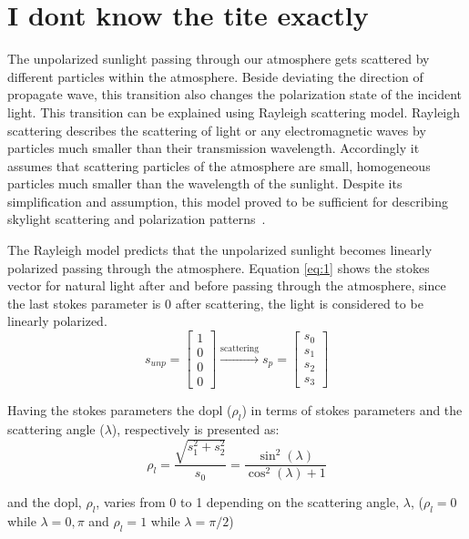 \section{I dont know the tite exactly}
\label{sec:rayleigh}

The unpolarized sunlight passing through our atmosphere gets scattered by
different particles within the atmosphere.  Beside deviating the direction of
propagate wave, this transition also changes the polarization state of the
incident light. This transition can be explained using Rayleigh scattering
model.  Rayleigh scattering describes the scattering of light or any
electromagnetic waves by particles much smaller than their transmission
wavelength. Accordingly it assumes that scattering particles of the atmosphere
are small, homogeneous particles much smaller than the wavelength of the
sunlight.  Despite its simplification and assumption, this model proved to be
sufficient for describing skylight scattering and polarization
patterns~\cite{pomozi2001clearsky, horvath2002ground}.

The Rayleigh model predicts that the unpolarized sunlight becomes linearly
polarized passing through the atmosphere.
Equation \ref{eq:1} shows the stokes vector for natural light after and before
passing through the atmosphere, since the last stokes parameter is $0$ after
scattering, the light is considered to be linearly polarized.
\begin{equation}
  \label{eq:1}
  s_{unp} =
  \begin{bmatrix}
    1\\0\\0\\0
  \end{bmatrix}
  \xrightarrow[]{\text{scattering}}
  s_{p}=
  \begin{bmatrix}
   s_0 \\ s_1 \\ s_2 \\ s_3
 \end{bmatrix}
\end{equation}

Having the stokes parameters the \gls{dopl} ($\rho_{l}$) in terms of stokes
parameters and the scattering angle ($\lambda$), respectively is presented as:
\begin{equation}
  \label{eq:2}
  \rho_{l} = \frac{\sqrt{s_{1}^{2}+s_{2}^{2}}}{s_0} =
  \frac{\sin^{2}(\lambda)}{\cos^{
      2}(\lambda)+1}
\end{equation}


and the \gls{dopl}, $\rho_{l}$, varies
from 0 to 1 depending on the scattering angle, $\lambda$, ($\rho_{l} = 0$ while
$\lambda = 0, \pi$ and $\rho_{l} =1$ while $\lambda =
\pi/2$)~\cite{smith2007polarization, miyazaki09sunlightpolarization}


